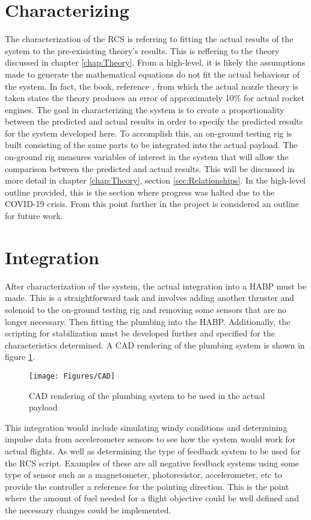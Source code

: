 \section{Characterizing}
The characterization of the RCS is referring to fitting the actual results of the system to the pre-exisisting theory's results. This is reffering to the theory discussed in chapter \ref{chap:Theory}. From a high-level, it is likely the assumptions made to generate the mathematical equations do not fit the actual behaviour of the system. In fact, the book, reference \cite{langton}, from which the actual nozzle theory is taken states the theory produces an error of approximately 10\% for actual rocket engines. The goal in characterizing the system is to create a proportionality between the predicted and actual results in order to specify the predicted results for the system developed here. To accomplish this, an on-ground testing rig is built consisting of the same parts to be integrated into the actual payload. The on-ground rig measures variables of interest in the system that will allow the comparison between the predicted and actual results. This will be discussed in more detail in chapter \ref{chap:Theory}, section \ref{sec:Relationships}. In the high-level outline provided, this is the section where progress was halted due to the COVID-19 crisis. From this point further in the project is considered an outline for future work.
\section{Integration}
After characterization of the system, the actual integration into a HABP must be made. This is a straightforward task and involves adding another thruster and solenoid to the on-ground testing rig and removing some sensors that are no longer necessary. Then fitting the plumbing into the HABP. Additionally, the scripting for stabilization must be developed further and specified for the characteristics determined. A CAD rendering of the plumbing system is shown in figure \ref{fig:CAD}.
\begin{figure}[h!]
\centering
\texttt{[image: Figures/CAD]}
\caption{CAD rendering of the plumbing system to be used in the actual payload}
\label{fig:CAD}
\end{figure}
This integration would include simulating windy conditions and determining impulse data from accelerometer sensors to see how the system would work for actual flights. As well as determining the type of feedback system to be used for the RCS script. Examples of these are all negative feedback systems using some type of sensor such as a magnetometer, photoresistor, accelerometer, etc to provide the controller a reference for the pointing direction. This is the point where the amount of fuel needed for a flight objective could be well defined and the necessary changes could be implemented.
